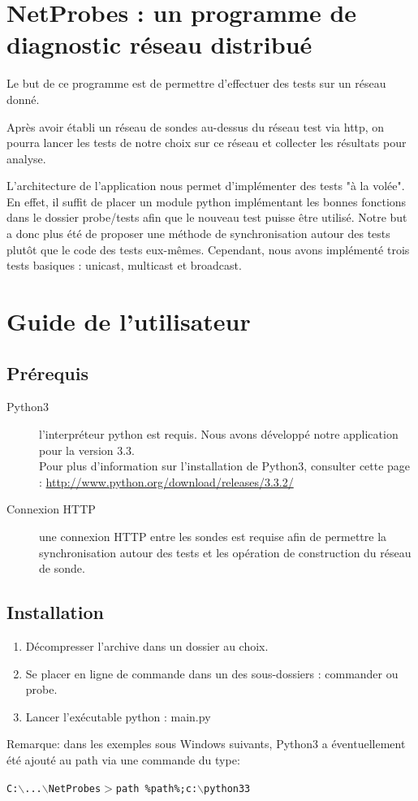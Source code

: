 \documentclass[a4paper,11pt]{article}
\begin{document}


\tableofcontents

\section{NetProbes : un programme de diagnostic réseau distribué}
Le but de ce programme est de permettre d'effectuer des tests sur un réseau donné.

Après avoir établi un réseau de sondes au-dessus du réseau test via http, on pourra lancer les tests de notre choix sur ce réseau et collecter les résultats pour analyse.

L'architecture de l'application nous permet d'implémenter des tests "à la volée". En effet, il suffit de placer un module python implémentant les bonnes fonctions dans le dossier probe/tests afin que le nouveau test puisse être utilisé. Notre but a donc plus été de proposer une méthode de synchronisation autour des tests plutôt que le code des tests eux-mêmes. Cependant, nous avons implémenté trois tests basiques : unicast, multicast et broadcast.

\section{Guide de l'utilisateur}

\subsection{Prérequis}
\begin{description}
\item[Python3] l'interpréteur python est requis. Nous avons développé notre application pour la version 3.3.\\
Pour plus d'information sur l'installation de Python3, consulter cette page : \href{http://www.python.org/download/releases/3.3.2/}{http://www.python.org/download/releases/3.3.2/}
\item[Connexion HTTP] une connexion HTTP entre les sondes est requise afin de permettre la synchronisation autour des tests et les opération de construction du réseau de sonde.
\end{description}

\subsection{Installation}
\begin{enumerate}
\item Décompresser l'archive dans un dossier au choix.
\item Se placer en ligne de commande dans un des sous-dossiers : commander ou probe.
\item Lancer l'exécutable python : main.py
\end{enumerate}
Remarque: dans les exemples sous Windows suivants, Python3 a éventuellement été ajouté au path via une commande du type:
\begin{center} \texttt{{\color{blue}C:$\backslash$...$\backslash$NetProbes$>$}path \%path\%;c:$\backslash$python33} \end{center}
\end{document}
